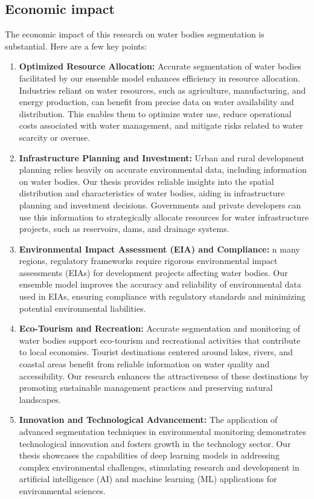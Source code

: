\subsection{Economic impact}
The economic impact of this research on water bodies segmentation is substantial. Here are a few key points:

\begin{enumerate}
    \item \textbf{Optimized Resource Allocation: }Accurate segmentation of water bodies facilitated by our ensemble model enhances efficiency in resource allocation. Industries reliant on water resources, such as agriculture, manufacturing, and energy production, can benefit from precise data on water availability and distribution. This enables them to optimize water use, reduce operational costs associated with water management, and mitigate risks related to water scarcity or overuse. 
    
    \item \textbf{Infrastructure Planning and Investment: }Urban and rural development planning relies heavily on accurate environmental data, including information on water bodies. Our thesis provides reliable insights into the spatial distribution and characteristics of water bodies, aiding in infrastructure planning and investment decisions. Governments and private developers can use this information to strategically allocate resources for water infrastructure projects, such as reservoirs, dams, and drainage systems.
    
    \item \textbf{Environmental Impact Assessment (EIA) and Compliance: }n many regions, regulatory frameworks require rigorous environmental impact assessments (EIAs) for development projects affecting water bodies. Our ensemble model improves the accuracy and reliability of environmental data used in EIAs, ensuring compliance with regulatory standards and minimizing potential environmental liabilities. 
    
    \item \textbf{Eco-Tourism and Recreation: }Accurate segmentation and monitoring of water bodies support eco-tourism and recreational activities that contribute to local economies. Tourist destinations centered around lakes, rivers, and coastal areas benefit from reliable information on water quality and accessibility. Our research enhances the attractiveness of these destinations by promoting sustainable management practices and preserving natural landscapes.
    
    \item \textbf{Innovation and Technological Advancement: }The application of advanced segmentation techniques in environmental monitoring demonstrates technological innovation and fosters growth in the technology sector. Our thesis showcases the capabilities of deep learning models in addressing complex environmental challenges, stimulating research and development in artificial intelligence (AI) and machine learning (ML) applications for environmental sciences. 
    
\end{enumerate}

